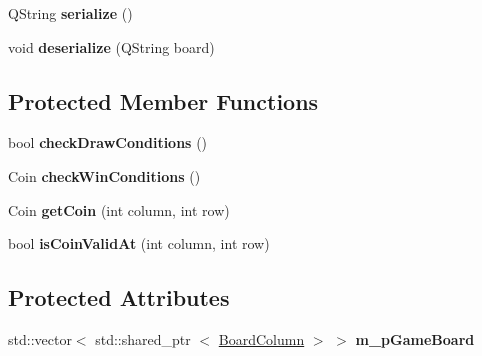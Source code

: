 \begin{DoxyCompactItemize}
\item 
\hypertarget{classGameBoard_ad533f495fa4f39c15e1164a1a5bb702e}{\-Q\-String {\bfseries serialize} ()}\label{classGameBoard_ad533f495fa4f39c15e1164a1a5bb702e}

\item 
\hypertarget{classGameBoard_abfd027ca1bf36698290855faff44d1a3}{void {\bfseries deserialize} (\-Q\-String board)}\label{classGameBoard_abfd027ca1bf36698290855faff44d1a3}

\end{DoxyCompactItemize}
\subsection*{\-Protected \-Member \-Functions}
\begin{DoxyCompactItemize}
\item 
\hypertarget{classGameBoard_a9d39bb64647af701a265251624287807}{bool {\bfseries check\-Draw\-Conditions} ()}\label{classGameBoard_a9d39bb64647af701a265251624287807}

\item 
\hypertarget{classGameBoard_a2ac14f3ff1d653e086136792fe0933d6}{\-Coin {\bfseries check\-Win\-Conditions} ()}\label{classGameBoard_a2ac14f3ff1d653e086136792fe0933d6}

\item 
\hypertarget{classGameBoard_a15b19b2ec1e4c63b47e113aba42d3ae3}{\-Coin {\bfseries get\-Coin} (int column, int row)}\label{classGameBoard_a15b19b2ec1e4c63b47e113aba42d3ae3}

\item 
\hypertarget{classGameBoard_ae43c300f4bc9df8a8d65231f96d335dd}{bool {\bfseries is\-Coin\-Valid\-At} (int column, int row)}\label{classGameBoard_ae43c300f4bc9df8a8d65231f96d335dd}

\end{DoxyCompactItemize}
\subsection*{\-Protected \-Attributes}
\begin{DoxyCompactItemize}
\item 
\hypertarget{classGameBoard_a62a11c93b4a0af85d3613351ac323485}{std\-::vector$<$ std\-::shared\-\_\-ptr\*
$<$ \hyperlink{classBoardColumn}{\-Board\-Column} $>$ $>$ {\bfseries m\-\_\-p\-Game\-Board}}\label{classGameBoard_a62a11c93b4a0af85d3613351ac323485}

\end{DoxyCompactItemize}


